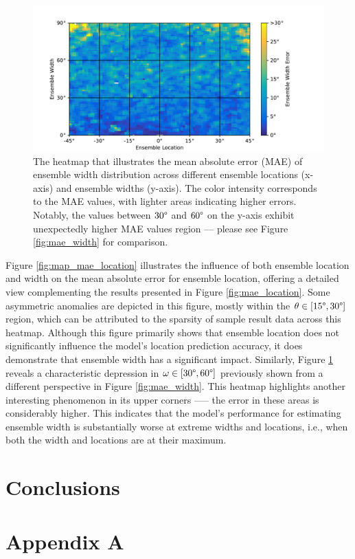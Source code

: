 \documentclass{article}
\begin{document}
\begin{figure}[ht]
  \centering
  \includegraphics[width=\linewidth]{../figures/map_mae_width.pdf}
  \caption{\label{fig:map_mae_width}The heatmap that illustrates the mean absolute error (MAE) of ensemble width distribution across different ensemble locations (x-axis) and ensemble widths (y-axis). The color intensity corresponds to the MAE values, with lighter areas indicating higher errors. Notably, the values between $30\degree$ and $60\degree$ on the y-axis exhibit unexpectedly higher MAE values region --- please see Figure \ref{fig:mae_width} for comparison. }
\end{figure}

Figure \ref{fig:map_mae_location} illustrates the influence of both ensemble location and width on the mean absolute error for ensemble location, offering a detailed view complementing the results presented in Figure \ref{fig:mae_location}. Some asymmetric anomalies are depicted in this figure, mostly within the $\theta \in [15\degree, 30\degree]$ region, which can be attributed to the sparsity of sample result data across this heatmap. Although this figure primarily shows that ensemble location does not significantly influence the model's location prediction accuracy, it does demonstrate that ensemble width has a significant impact. Similarly, Figure \ref{fig:map_mae_width} reveals a characteristic depression in $\omega \in [30\degree, 60\degree]$ previously shown from a different perspective in Figure \ref{fig:mae_width}. This heatmap highlights another interesting phenomenon in its upper corners --— the error in these areas is considerably higher. This indicates that the model's performance for estimating ensemble width is substantially worse at extreme widths and locations, i.e., when both the width and locations are at their maximum.

\section{Conclusions}
\label{sec:conclusions}


\clearpage
\section*{Appendix A}
\label{appendix:a_hrtf}

\printbibliography
\end{document}
